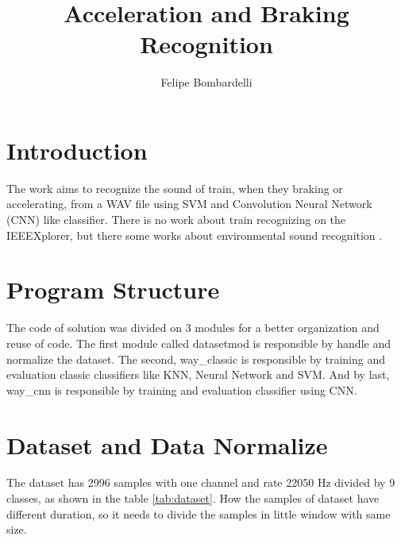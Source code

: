 \documentclass[12pt,oneside,a4paper]{article}
\title{Acceleration and Braking Recognition}
\author{Felipe Bombardelli}
\begin{document}
\maketitle

\section{Introduction}

The work aims to recognize the sound of train, when they braking or accelerating, from a WAV file using SVM and Convolution Neural Network (CNN) like classifier. There is no work about train recognizing on the IEEEXplorer, but there some works about environmental sound recognition \cite{chachada-survey}\cite{huzaifah-features}.



\section{Program Structure}

The code of solution was divided on 3 modules for a better organization and reuse of code. The first module called datasetmod is responsible by handle and normalize the dataset. The second, way\_classic is responsible by training and evaluation classic classifiers like KNN, Neural Network and SVM. And by last, way\_cnn is responsible by training and evaluation  classifier using CNN.


\section{Dataset and Data Normalize}

The dataset has 2996 samples with one channel and rate 22050 Hz divided by 9 classes, as shown in the table \ref{tab:dataset}.
How the samples of dataset have different duration, so it needs to divide the samples in little window with same size.
\end{document}
